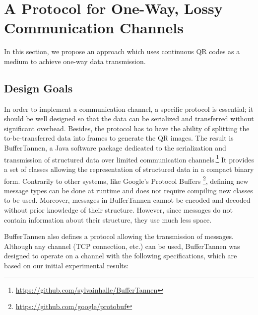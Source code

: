 
\section{A Protocol for One-Way, Lossy Communication Channels}\label{sec:qr:protocol} %

In this section, we propose an approach which uses continuous QR codes as a medium to achieve one-way data transmission.

\subsection{Design Goals}

In order to implement a communication channel, a specific protocol is essential; it should be well designed so that the data can be serialized and transferred without significant overhead. Besides, the protocol has to have the ability of splitting the to-be-transferred data into frames to generate the QR images. The result is BufferTannen, a Java software package dedicated to the serialization and transmission of structured data over limited communication channels.\footnote{\url{https://github.com/sylvainhalle/BufferTannen}} It provides a set of classes allowing the representation of structured data in a compact binary form. Contrarily to other systems, like Google's Protocol Buffers \footnote{\url{https://github.com/google/protobuf}}, defining new message types can be done at runtime and does not require compiling new classes to be used. Moreover, messages in BufferTannen cannot be encoded and decoded without prior knowledge of their structure. However, since messages do not contain information about their structure, they use much less space.

BufferTannen also defines a protocol allowing the transmission of messages.  Although any channel (TCP connection, etc.) can be used, BufferTannen was designed to operate on a channel with the following specifications, which are based on our initial experimental results:

